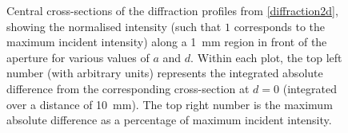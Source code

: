 \documentclass[../Thesis-IJspeert.tex]{subfiles}
\begin{document}
\begin{figure}[t]
	\caption[Central cross-sections of the diffraction profiles from a pyramid MOT mirror configuration]{Central cross-sections of the diffraction profiles from \autoref{diffraction2d}, showing the normalised intensity (such that $1$ corresponds to the maximum incident intensity) along a \SI{1}{\milli\meter} region in front of the aperture for various values of $a$ and $d$. Within each plot, the top left number (with arbitrary units) represents the integrated absolute difference from the corresponding cross-section at $d=0$ (integrated over a distance of \SI{10}{\milli\meter}). The top right number is the maximum absolute difference as a percentage of maximum incident intensity.}
\label{diffraction1d}
\end{figure}
\end{document}
